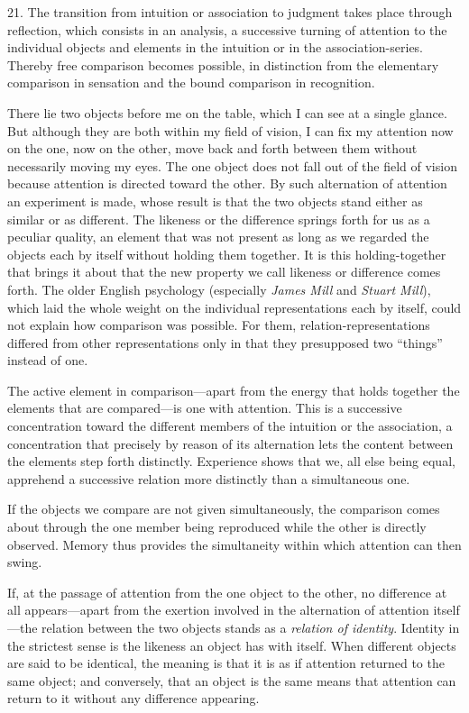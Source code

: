 \documentclass[12pt,a4paper]{book}
\newcommand{\opage}[1]{\marginnote{\footnotesize\textit{[#1]}}}
\begin{document}
21. The transition from intuition or association to judgment takes place
through reflection, which consists in an analysis, a successive turning of
attention to the individual objects and elements in the intuition or in
the association-series. Thereby free comparison becomes possible, in
distinction from the elementary comparison in sensation and the bound
comparison in recognition.

There lie two objects before me on the table, which I can see at a single
glance. But although they are both within my \opage{64}field of vision, I can fix my
attention now on the one, now on the other, move back and forth between
them without necessarily moving my eyes. The one object does not fall out
of the field of vision because attention is directed toward the other. By
such alternation of attention an experiment is made, whose result is that
the two objects stand either as similar or as different. The likeness or
the difference springs forth for us as a peculiar quality, an element that
was not present as long as we regarded the objects each by itself without
holding them together. It is this holding-together that brings it about
that the new property we call likeness or difference comes forth. The
older English psychology (especially \emph{James Mill} and \emph{Stuart
Mill}), which laid the whole weight on the individual representations each
by itself, could not explain how comparison was possible. For them,
relation-representations differed from other representations only in that
they presupposed two ``things'' instead of one.

The active element in comparison---apart from the energy that holds
together the elements that are compared---is one with attention. This is a
successive concentration toward the different members of the intuition or
the association, a concentration that precisely by reason of its
alternation lets the content between the elements step forth distinctly.
Experience shows that we, all else being equal, apprehend a successive
relation more distinctly than a simultaneous one.

If the objects we compare are not given simultaneously, the comparison
comes about through the one member being reproduced while the other is
directly observed. Memory thus provides the simultaneity within which
attention can then swing.

If, at the passage of attention from the one object to the other, no
difference at all appears---apart from the exertion involved in the
alternation of attention itself---the relation between the two objects
stands as a \emph{relation of identity}. Identity in the strictest sense
is the likeness an object has with itself. When different objects are said
to be identical, \opage{65}the meaning is that it is as if attention returned to the
same object; and conversely, that an object is the same means that
attention can return to it without any difference appearing.
\end{document}
